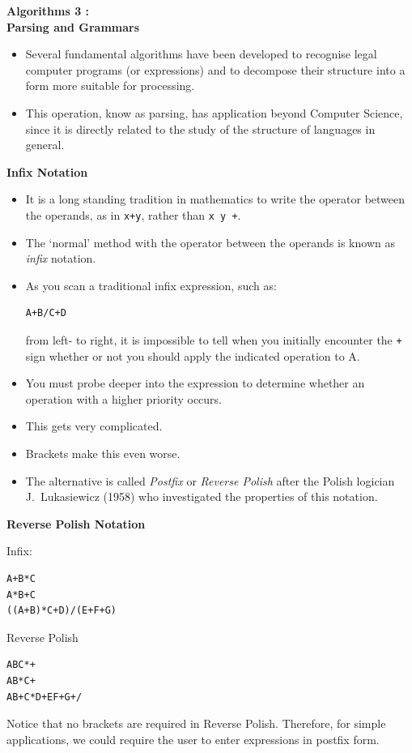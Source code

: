 \newpage
{\samepage
\begin{center}
{\Large{\bf Algorithms 3 :\\ Parsing and Grammars}}
\end{center}
\begin{itemize}
\item Several fundamental algorithms have been developed
to recognise legal computer programs (or expressions) and to
decompose their structure into a form more suitable for processing.
\item This operation, know as parsing, has application
beyond Computer Science, since it is directly related to the study of
the structure of languages in general.
\end{itemize}
}


\newpage
{\samepage
\begin{center}
{\Large{\bf Infix Notation}}
\end{center}
{\small
\begin{itemize}
\item It is a long standing tradition in mathematics to write the operator
between the operands, as in \verb^x+y^, rather than \verb^x y +^.
\item The `normal' method with the operator between the operands is
known as {\it infix} notation.
\item As you scan a traditional infix expression, such as:
\begin{verbatim}
A+B/C+D
\end{verbatim}
from left- to right, it is impossible to tell when you initially encounter the \verb^+^ sign whether or not you should apply the indicated operation to
A.
\item You must probe deeper into the expression to determine whether an operation with a higher priority occurs.
\item This gets very complicated.
\item Brackets make this even worse.
\item The alternative is called {\it Postfix} or {\it Reverse Polish}
after the Polish logician J.\ Lukasiewicz (1958) who investigated the
properties of this notation.
\end{itemize}
}}

\newpage
{\samepage
\begin{center}
{\Large{\bf Reverse Polish Notation}}
\end{center}

Infix:
\begin{verbatim}
A+B*C
A*B+C
((A+B)*C+D)/(E+F+G)
\end{verbatim}

Reverse Polish
\begin{verbatim}
ABC*+
AB*C+
AB+C*D+EF+G+/
\end{verbatim}

Notice that no brackets are required in Reverse Polish. Therefore,
for simple applications, we could require the user to enter expressions
in postfix form.
}

